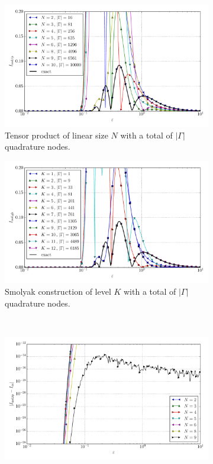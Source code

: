 \documentclass[a4paper,10pt]{article}
\begin{document}
\begin{figure}[ht!]
  \begin{subfigure}[t]{0.5\linewidth}
    \includegraphics[width=\linewidth]{./plots/tp_sg_4d_conv_eps_(8,0,1,0)_(8,1,0,0)_val_nsd_tp.pdf}
    \caption{Tensor product of linear size $N$ with a total of $|\Gamma|$ quadrature nodes.}
    \label{fig:tp_sg_4d_conv_p_8010_8100_val_nsd_tp}
  \end{subfigure}
  \begin{subfigure}[t]{0.5\linewidth}
    \includegraphics[width=\linewidth]{./plots/tp_sg_4d_conv_eps_(8,0,1,0)_(8,1,0,0)_val_nsd_gk.pdf}
    \caption{Smolyak construction of level $K$ with a total of $|\Gamma|$ quadrature nodes.}
    \label{fig:tp_sg_4d_conv_p_8010_8100_val_nsd_gk}
  \end{subfigure} \\
  \begin{subfigure}[t]{0.5\linewidth}
    \includegraphics[width=\linewidth]{./plots/tp_sg_4d_conv_eps_(8,0,1,0)_(8,1,0,0)_err_nsd_tp.pdf}

\end{subfigure}
\end{figure}
\end{document}
